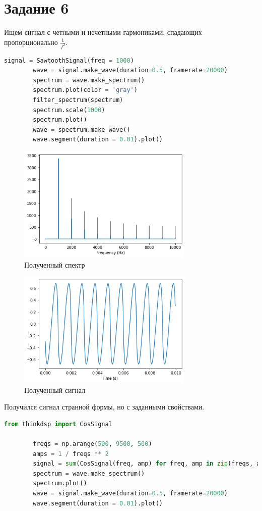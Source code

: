 \documentclass[a4paper, 12pt]{report}
\begin{document}
	\section{Задание 6}
	Ищем сигнал с четными и нечетными гармониками, спадающих пропорционально  $\frac{1}{f^2}$.
	 \begin{lstlisting}[language=Python,caption=Взяли пилообразный сигнал и уменьшили его амплитуду]
		signal = SawtoothSignal(freq = 1000)
		wave = signal.make_wave(duration=0.5, framerate=20000)
		spectrum = wave.make_spectrum()
		spectrum.plot(color = 'gray')
		filter_spectrum(spectrum)
		spectrum.scale(1000)
		spectrum.plot()
		wave = spectrum.make_wave()
		wave.segment(duration = 0.01).plot()
	\end{lstlisting}
	\begin{figure}[H]
		\centering
		\includegraphics[width=0.75\textwidth]{result1.png}
		\caption{Полученный спектр}
		\label{fig:result1}
	\end{figure}
	\begin{figure}[H]
		\centering
		\includegraphics[width=0.75\textwidth]{result2.png}
		\caption{Полученный сигнал}
		\label{fig:result2}
	\end{figure}
	Получился сигнал странной формы, но с заданными свойствами. 
	\begin{lstlisting}[language=Python,caption=Второй способ]
		from thinkdsp import CosSignal

		freqs = np.arange(500, 9500, 500)
		amps = 1 / freqs ** 2
		signal = sum(CosSignal(freq, amp) for freq, amp in zip(freqs, amps))
		spectrum = wave.make_spectrum()
		spectrum.plot()
		wave = signal.make_wave(duration=0.5, framerate=20000)
		wave.segment(duration = 0.01).plot()
	\end{lstlisting}
\end{document}

